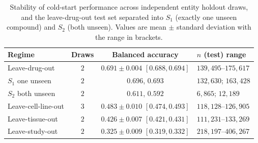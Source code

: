 \documentclass{bmcart}
\begin{document}
\begin{backmatter}
\begin{table}[h!]
\caption{Stability of cold-start performance across independent entity holdout draws, and the
leave-drug-out test set separated into $S_1$ (exactly one unseen compound) and $S_2$ (both unseen).
Values are mean $\pm$ standard deviation with the range in brackets.}
\label{tab:multiseed}
\begin{tabular}{lccl}
\toprule
Regime & Draws & Balanced accuracy & $n$ (test) range \\
\midrule
Leave-drug-out       & $2$ & $0.691 \pm 0.004$ $[0.688,0.694]$ & $139{,}495$--$175{,}617$ \\
\quad $S_1$ one unseen  & $2$ & $0.696$, $0.693$ & $132{,}630$; $163{,}428$ \\
\quad $S_2$ both unseen & $2$ & $0.611$, $0.592$ & $6{,}865$; $12{,}189$ \\
Leave-cell-line-out  & $3$ & $0.483 \pm 0.010$ $[0.474,0.493]$ & $118{,}128$--$126{,}905$ \\
Leave-tissue-out     & $2$ & $0.426 \pm 0.007$ $[0.421,0.431]$ & $111{,}231$--$133{,}269$ \\
Leave-study-out      & $2$ & $0.325 \pm 0.009$ $[0.319,0.332]$ & $218{,}197$--$406{,}267$ \\
\bottomrule
\end{tabular}
\end{table}

\end{backmatter}
\end{document}
